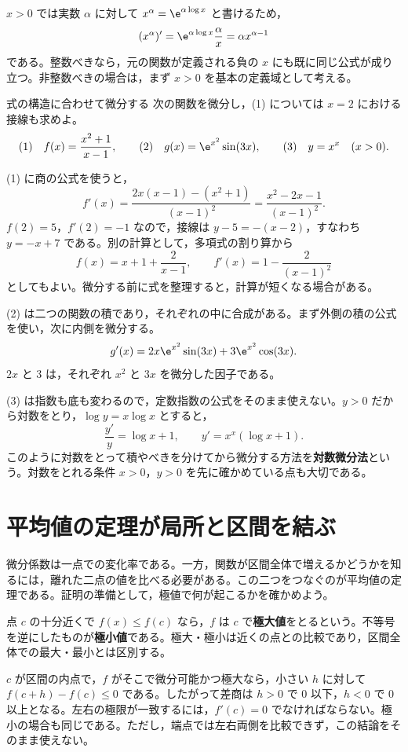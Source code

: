 $x>0$ では実数 $\alpha$ に対して $x^\alpha=\e^{\alpha\log x}$ と書けるため，
\[
 (x^\alpha)'=\e^{\alpha\log x}\frac\alpha x
 =\alpha x^{\alpha-1}
\]
である。整数べきなら，元の関数が定義される負の $x$ にも既に同じ公式が成り立つ。非整数べきの場合は，まず $x>0$ を基本の定義域として考える。

\begin{example}{式の構造に合わせて微分する}
次の関数を微分し，(1) については $x=2$ における接線も求めよ。
\[
 \text{(1)}\quad f(x)=\frac{x^2+1}{x-1},\qquad
 \text{(2)}\quad g(x)=\e^{x^2}\sin(3x),\qquad
 \text{(3)}\quad y=x^x\quad(x>0).
\]
\end{example}
(1) に商の公式を使うと，
\[
 f'(x)=\frac{2x(x-1)-(x^2+1)}{(x-1)^2}
      =\frac{x^2-2x-1}{(x-1)^2}.
\]
$f(2)=5$，$f'(2)=-1$ なので，接線は $y-5=-(x-2)$，すなわち $y=-x+7$ である。別の計算として，多項式の割り算から
\[
 f(x)=x+1+\frac2{x-1},\qquad
 f'(x)=1-\frac2{(x-1)^2}
\]
としてもよい。微分する前に式を整理すると，計算が短くなる場合がある。

(2) は二つの関数の積であり，それぞれの中に合成がある。まず外側の積の公式を使い，次に内側を微分する。
\[
 g'(x)=2x\e^{x^2}\sin(3x)+3\e^{x^2}\cos(3x).
\]
$2x$ と $3$ は，それぞれ $x^2$ と $3x$ を微分した因子である。

(3) は指数も底も変わるので，定数指数の公式をそのまま使えない。$y>0$ だから対数をとり，$\log y=x\log x$ とすると，
\[
 \frac{y'}y=\log x+1,
 \qquad y'=x^x(\log x+1).
\]
このように対数をとって積やべきを分けてから微分する方法を\textbf{対数微分法}という。対数をとれる条件 $x>0$，$y>0$ を先に確かめている点も大切である。

\section{平均値の定理が局所と区間を結ぶ}\label{節:平均値定理}
微分係数は一点での変化率である。一方，関数が区間全体で増えるかどうかを知るには，離れた二点の値を比べる必要がある。この二つをつなぐのが平均値の定理である。証明の準備として，極値で何が起こるかを確かめよう。

点 $c$ の十分近くで $f(x)\le f(c)$ なら，$f$ は $c$ で\textbf{極大値}をとるという。不等号を逆にしたものが\textbf{極小値}である。極大・極小は近くの点との比較であり，区間全体での最大・最小とは区別する。

$c$ が区間の内点で，$f$ がそこで微分可能かつ極大なら，小さい $h$ に対して $f(c+h)-f(c)\le0$ である。したがって差商は $h>0$ で $0$ 以下，$h<0$ で $0$ 以上となる。左右の極限が一致するには，$f'(c)=0$ でなければならない。極小の場合も同じである。ただし，端点では左右両側を比較できず，この結論をそのまま使えない。

